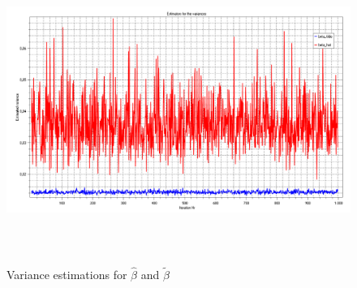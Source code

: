 \documentclass[11pt]{article}
\theoremstyle{break}
\begin{document}
\begin{figure}[H]
\centering
\includegraphics[height=100mm]{variance_estimators.pdf}
\caption{Variance estimations for $\hat{\beta}$ and $\tilde{\beta}$}
\label{estimated variances}
\end{figure}
\end{document}
